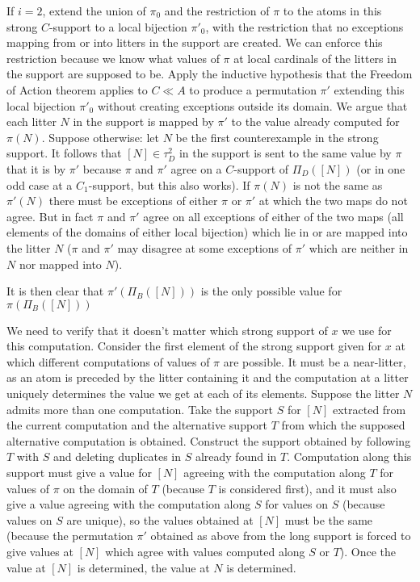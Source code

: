 \documentclass[12pt]{article}
\begin{document}
If $i=2$, extend the union of $\pi_0$ and the restriction of $\pi$ to the atoms in this strong $C$-support to a local bijection $\pi'_0$, with the restriction
that no exceptions mapping from or into litters in the support are created.  We can enforce this restriction because we know what values of $\pi$ at local cardinals of the litters in the support are supposed to be.  Apply the inductive hypothesis that the Freedom of Action theorem applies to $C\ll A$ to produce
a permutation $\pi'$ extending this local bijection $\pi'_0$ without creating exceptions outside its domain.   We argue that each litter $N$ in the support is mapped by $\pi'$ to the value
already computed for $\pi(N)$.  Suppose otherwise:  let $N$ be the first counterexample in the strong support.  It follows that $[N]\in \tau^2_D$ in the support is sent to the same value by $\pi$ that it is by $\pi'$ because $\pi$ and $\pi'$ agree on a $C$-support of $\Pi_D([N])$ (or in one odd case at a $C_1$-support, but this also works).  If $\pi(N)$ is not the same as $\pi'(N)$ there must be exceptions of either $\pi$ or $\pi'$ at which the two maps do not agree.  But in fact $\pi$ and $\pi'$ agree on all exceptions of either of the two maps (all elements of the domains of either local bijection) which lie in or are mapped into the litter $N$ ($\pi$ and $\pi'$ may disagree at some exceptions of $\pi'$ which are neither in $N$ nor mapped into $N$).

It is then clear that $\pi'(\Pi_B([N]))$ is the only possible value for  $\pi(\Pi_B([N]))$

We need to verify that it doesn't matter which strong support of $x$ we use for this computation.  Consider the first element of the strong support given for
$x$ at which different computations of values of $\pi$ are possible.  It must be a near-litter, as an atom is preceded by the litter containing it and the computation at a litter
uniquely determines the value we get at each of its elements.  Suppose the litter $N$ admits more than one computation.  Take the support $S$ for $[N]$ extracted
from the current computation and the alternative support $T$ from which the supposed alternative computation is obtained.  Construct the support obtained by
following $T$ with $S$ and deleting duplicates in $S$ already found in $T$.  Computation along this support must give a value for $[N]$ agreeing with the computation
along $T$ for values of $\pi$ on the domain of $T$ (because $T$ is considered first), and it must also give a value agreeing with the computation along $S$ for values on $S$ (because values on $S$ are unique), so the values obtained at $[N]$ must be the same (because the permutation $\pi'$ obtained as above from the long support is forced to give values at $[N]$ which agree with values computed along $S$ or $T$).  Once the value at $[N]$ is determined, the value at $N$ is determined.
\end{document}
